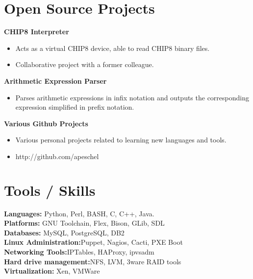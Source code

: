 \documentclass[10pt,line,margin,letterpaper]{res}
\begin{document}
\address{4245 Stanley Blvd. Apt. 6, Pleasanton, CA}
\address{aaron.peschel@gmail.com or (760)-791-7301}

\begin{resume}
\pagestyle{empty}
\section {Open Source Projects}
    {\bf CHIP8 Interpreter}
    \begin{itemize} \itemsep -2pt
    \item Acts as a virtual CHIP8 device, able to read CHIP8 binary files.
    \item Collaborative project with a former colleague.
    \end{itemize}

    {\bf Arithmetic Expression Parser}
    \begin{itemize} \itemsep -2pt
    \item Parses arithmetic expressions in infix notation and outputs the corresponding expression simplified in prefix notation.
    \end{itemize}

    {\bf Various Github Projects}
    \begin{itemize} \itemsep -2pt
    \item Various personal projects related to learning new languages and tools.
    \item http://github.com/apeschel
    \end{itemize}

\section{Tools / Skills}
    {\bf Languages:} Python, Perl, BASH, C, C++, Java. \\
    {\bf Platforms:} GNU Toolchain, Flex, Bison, GLib, SDL \\
    {\bf Databases:} MySQL, PostgreSQL, DB2 \\
    {\bf Linux Administration:}Puppet, Nagios, Cacti, PXE Boot \\
    {\bf Networking Tools:}IPTables, HAProxy, ipvsadm \\
    {\bf Hard drive management:}NFS, LVM, 3ware RAID tools \\
    {\bf Virtualization:} Xen, VMWare \\


\end{resume}
\end{document}
